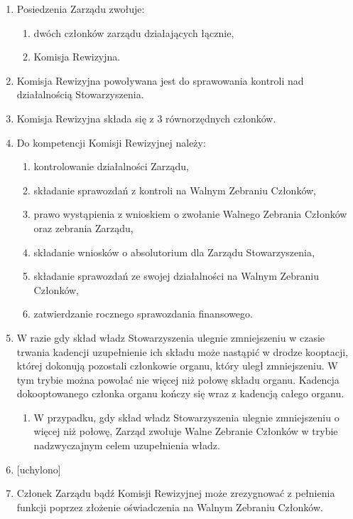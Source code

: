 \documentclass{article}
\begin{document}
\begin{enumerate}
    \item Posiedzenia Zarządu zwołuje:
      \begin{enumerate}
        \item dwóch członków zarządu działających łącznie,
        \item Komisja Rewizyjna.
      \end{enumerate}
    \item Komisja Rewizyjna powoływana jest do sprawowania kontroli nad działalnością Stowarzyszenia.
    \item Komisja Rewizyjna składa się z 3 równorzędnych członków.
    \item Do kompetencji Komisji Rewizyjnej należy:
      \begin{enumerate}
        \item kontrolowanie działalności Zarządu,
        \item składanie sprawozdań z kontroli na Walnym Zebraniu Członków,
        \item prawo wystąpienia z wnioskiem o zwołanie Walnego Zebrania Członków oraz zebrania Zarządu,
        \item składanie wniosków o absolutorium dla Zarządu Stowarzyszenia,
        \item składanie sprawozdań ze swojej działalności na Walnym Zebraniu Członków,
        \item zatwierdzanie rocznego sprawozdania finansowego.
      \end{enumerate}
    \item W razie gdy skład władz Stowarzyszenia ulegnie zmniejszeniu w czasie trwania kadencji uzupełnienie ich składu może nastąpić w drodze kooptacji, której dokonują pozostali członkowie organu, który uległ zmniejszeniu. W tym trybie można powołać nie więcej niż połowę składu organu. Kadencja dokooptowanego członka organu kończy się wraz z kadencją całego organu.
      \begin{enumerate}
        \item W przypadku, gdy skład władz Stowarzyszenia ulegnie zmniejszeniu o więcej niż połowę, Zarząd zwołuje Walne Zebranie Członków w trybie nadzwyczajnym celem uzupełnienia władz.
      \end{enumerate}
    \item {[uchylono]}
    \item Członek Zarządu bądź Komisji Rewizyjnej może zrezygnować z pełnienia funkcji poprzez złożenie oświadczenia na Walnym Zebraniu Członków.
  \end{enumerate}
\end{document}
